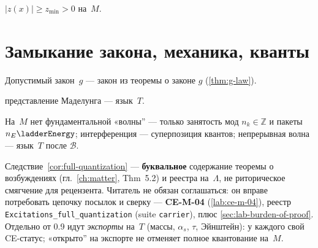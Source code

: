 \begin{corollary}
\label{cor:vacuum-floor}
$|z(x)|\ge z_{\min}>0$ на~$M$.
\end{corollary}

\section{Замыкание закона, механика, кванты}

\begin{corollary}[Замыкание $g$]
\label{cor:g-closure}
Допустимый закон~$g$ --- закон из теоремы о законе $g$ (\cref{thm:g-law}).
\end{corollary}

\begin{corollary}
\label{cor:landau}
представление Маделунга --- язык~$T$.
\end{corollary}

\begin{corollary}
\label{cor:full-quantization}
На~$M$ нет фундаментальной «волны'' --- только занятость мод $n_k\in\mathbb{Z}$ и пакеты $n_E\ladderEnergy$;
интерференция --- суперпозиция квантов; непрерывная волна --- язык~$T$ после $\mathcal{B}$.
\end{corollary}

\begin{remark}
\label{rem:full-quant-proof}
Следствие~\ref{cor:full-quantization} --- \textbf{буквальное} содержание теоремы о возбуждениях
(гл.~\ref{ch:matter}, Thm~5.2) и реестра на~$\Lambda$, не риторическое смягчение для рецензента.
Читатель не обязан соглашаться: он вправе потребовать цепочку посылок и сверку ---
\textbf{CE-M-04} (\cref{lab:ce-m-04}), реестр \texttt{Excitations\_full\_quantization}
(suite \texttt{carrier}), плюс \cref{sec:lab-burden-of-proof}.
Отдельно от 0.9 идут \emph{экспорты} на~$T$ (массы, $\alpha_s$, $\tau$, Эйнштейн): у каждого свой CE-статус;
«открыто'' на экспорте не отменяет полное квантование на~$M$.
\end{remark}


